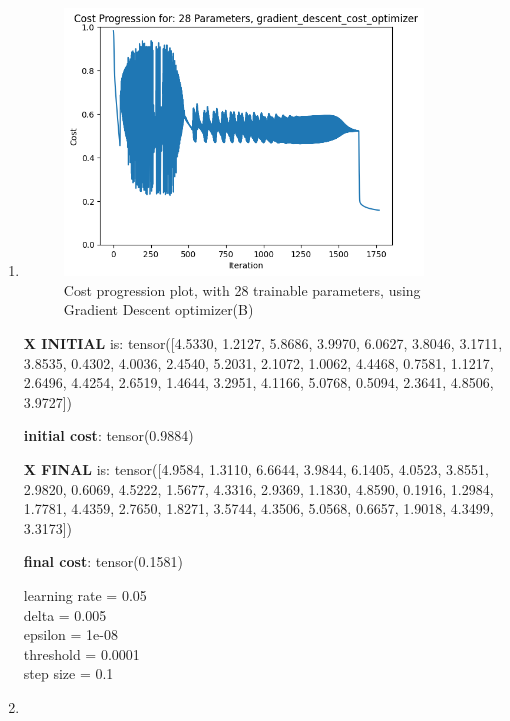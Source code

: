 \documentclass[inscr,ack,preface]{diphdthesis}
\begin{document}
\begin{enumerate}[label=\textbf{\Alph*.}]
    \item \textbf{  }
    
    \begin{figure}[H]
        \centering
        \includegraphics[width=0.9\textwidth]{plots/28s.png}
        \caption{Cost progression plot, with 28 trainable parameters, using Gradient Descent optimizer(B)} 
        \label{fig:fig2}
    \end{figure}
    
    \textbf{X INITIAL}  is:
    tensor([4.5330, 1.2127, 5.8686, 3.9970, 6.0627, 3.8046, 3.1711, 3.8535, 0.4302,
            4.0036, 2.4540, 5.2031, 2.1072, 1.0062, 4.4468, 0.7581, 1.1217, 2.6496,
            4.4254, 2.6519, 1.4644, 3.2951, 4.1166, 5.0768, 0.5094, 2.3641, 4.8506,
            3.9727])
            
    \textbf{initial cost}: tensor(0.9884)
    
    \textbf{X FINAL} is:
    tensor([4.9584, 1.3110, 6.6644, 3.9844, 6.1405, 4.0523, 3.8551, 2.9820, 0.6069,
            4.5222, 1.5677, 4.3316, 2.9369, 1.1830, 4.8590, 0.1916, 1.2984, 1.7781,
            4.4359, 2.7650, 1.8271, 3.5744, 4.3506, 5.0568, 0.6657, 1.9018, 4.3499,
            3.3173])
    
    \textbf{final cost}: tensor(0.1581)
    
    learning rate =  0.05 \\
    delta =  0.005 \\
    epsilon =  1e-08 \\
    threshold =  0.0001\\ 
    step size =  0.1 \\
    
    \item{ }
    

\end{enumerate}
\end{document}
